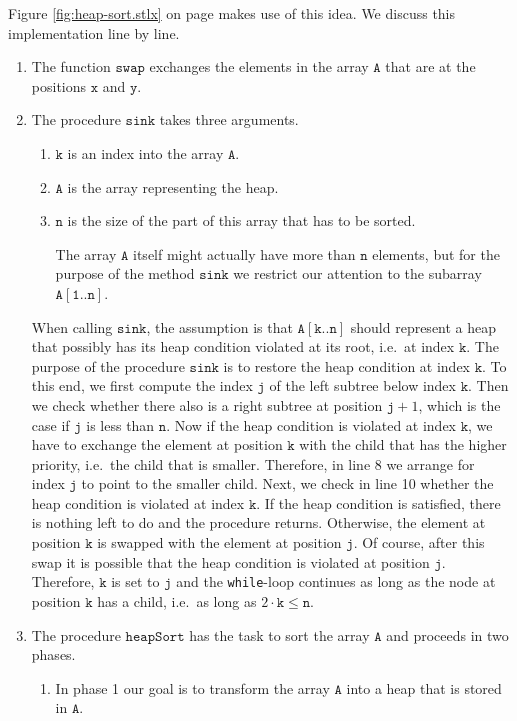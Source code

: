 Figure \ref{fig:heap-sort.stlx} on page \pageref{fig:basic-heapsort.stlx} makes use of this idea.
We discuss this implementation line by line.
\begin{enumerate}
\item The function $\mathtt{swap}$ exchanges the elements in the array $\mathtt{A}$ that are at the
      positions $\mathtt{x}$ and $\mathtt{y}$.
\item The procedure $\mathtt{sink}$ takes three arguments.
      \begin{enumerate}
      \item $\mathtt{k}$ is an index into the array $\mathtt{A}$.
      \item $\mathtt{A}$ is the array representing the heap.
      \item $\mathtt{n}$ is the size of the part of this array that has to be sorted.  

            The array $\mathtt{A}$ itself might actually have more than $\mathtt{n}$ elements, but for the
            purpose of the method $\mathtt{sink}$ we restrict our attention to the subarray
            $\mathtt{A[1..n]}$. 
      \end{enumerate}
      When calling $\mathtt{sink}$, the assumption is that $\mathtt{A}[\mathtt{k..n}]$ should represent a heap 
      that possibly has its heap condition violated at its root, i.e.~at index $\mathtt{k}$.  The
      purpose of the procedure $\mathtt{sink}$ is to restore the heap condition at index $\mathtt{k}$.
      To this end, we first compute the index $\mathtt{j}$ of the left subtree below index $\mathtt{k}$.
      Then we check whether there also is a right subtree at position $\mathtt{j}+1$, which is the
      case if $\mathtt{j}$ is less than $\mathtt{n}$.  Now if the heap condition is violated at index
      $\mathtt{k}$, we have to exchange the element at  position $\mathtt{k}$ with the child that has
      the higher priority, i.e.~the child that is smaller. Therefore, in line 8 we arrange for index
      $\mathtt{j}$ to point to the smaller child.  Next, we check in line 10 whether the heap
      condition is violated at index $\mathtt{k}$.  If the heap condition is satisfied, there is
      nothing left to do and the procedure returns.  Otherwise, the element at position $\mathtt{k}$ is swapped with
      the element at position $\mathtt{j}$.  Of course, after this swap it is possible that the heap condition is
      violated at position $\mathtt{j}$.  Therefore,  $\mathtt{k}$ is set to $\mathtt{j}$ and the \texttt{while}-loop continues
      as long as the node at position $\mathtt{k}$ has a child, i.e.~as long as 
      $2 \cdot \mathtt{k}\leq \mathtt{n}$.
\item The procedure $\mathtt{heapSort}$ has the task to sort the array $\mathtt{A}$ and proceeds in two phases.
      \begin{enumerate}
      \item In phase 1 our goal is to transform the array $\mathtt{A}$ into a heap that is stored in $\mathtt{A}$.


\end{enumerate}
\end{enumerate}
